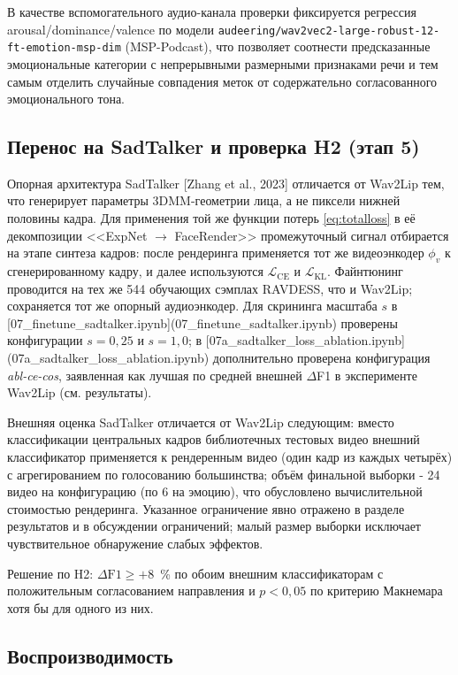 \documentclass[a4paper, 12pt, oneside, openany]{article}
\begin{document}
В качестве вспомогательного аудио-канала проверки фиксируется регрессия arousal/dominance/valence по модели \texttt{audeering/wav2vec2-large-robust-12-ft-emotion-msp-dim} (MSP-Podcast), что позволяет соотнести предсказанные эмоциональные категории с непрерывными размерными признаками речи и тем самым отделить случайные совпадения меток от содержательно согласованного эмоционального тона.

\subsection{Перенос на SadTalker и проверка H2 (этап 5)}

Опорная архитектура SadTalker [Zhang et al., 2023] отличается от Wav2Lip тем, что генерирует параметры 3DMM-геометрии лица, а не пиксели нижней половины кадра. Для применения той же функции потерь \eqref{eq:totalloss} в её декомпозиции <<ExpNet $\to$ FaceRender>> промежуточный сигнал отбирается на этапе синтеза кадров: после рендеринга применяется тот же видеоэнкодер $\phi_v$ к сгенерированному кадру, и далее используются $\mathcal{L}_{\text{CE}}$ и $\mathcal{L}_{\text{KL}}$. Файнтюнинг проводится на тех же 544 обучающих сэмплах RAVDESS, что и Wav2Lip; сохраняется тот же опорный аудиоэнкодер. Для скрининга масштаба $s$ в [07\_finetune\_sadtalker.ipynb](07\_finetune\_sadtalker.ipynb) проверены конфигурации $s=0{,}25$ и $s=1{,}0$; в [07a\_sadtalker\_loss\_ablation.ipynb](07a\_sadtalker\_loss\_ablation.ipynb) дополнительно проверена конфигурация \textit{abl-ce-cos}, заявленная как лучшая по средней внешней $\Delta$F1 в эксперименте Wav2Lip (см. результаты).

Внешняя оценка SadTalker отличается от Wav2Lip следующим: вместо классификации центральных кадров библиотечных тестовых видео внешний классификатор применяется к рендеренным видео (один кадр из каждых четырёх) с агрегированием по голосованию большинства; объём финальной выборки - 24 видео на конфигурацию (по 6 на эмоцию), что обусловлено вычислительной стоимостью рендеринга. Указанное ограничение явно отражено в разделе результатов и в обсуждении ограничений; малый размер выборки исключает чувствительное обнаружение слабых эффектов.

Решение по H2: $\Delta\text{F1} \geq +8$~\% по обоим внешним классификаторам с положительным согласованием направления и $p < 0{,}05$ по критерию Макнемара хотя бы для одного из них.

\subsection{Воспроизводимость}
\end{document}
